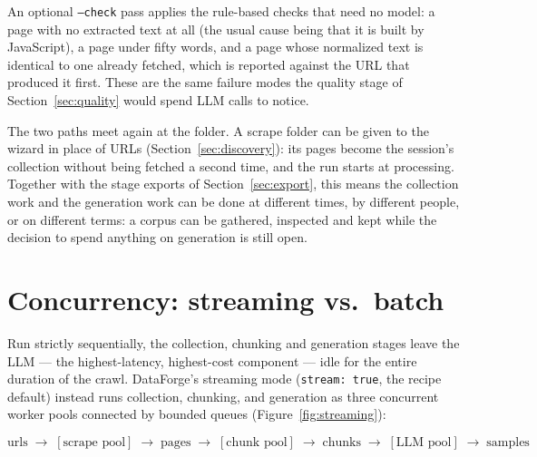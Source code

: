 \documentclass[11pt]{article}
\begin{document}
An optional \texttt{--check} pass applies the rule-based checks that need
no model: a page with no extracted text at all (the usual cause being
that it is built by JavaScript), a page under fifty words, and a page
whose normalized text is identical to one already fetched, which is
reported against the URL that produced it first. These are the same
failure modes the quality stage of Section~\ref{sec:quality} would spend
LLM calls to notice.

The two paths meet again at the folder. A scrape folder can be given to
the wizard in place of URLs (Section~\ref{sec:discovery}): its pages
become the session's collection without being fetched a second time, and
the run starts at processing. Together with the stage exports of
Section~\ref{sec:export}, this means the collection work and the
generation work can be done at different times, by different people, or
on different terms: a corpus can be gathered, inspected and kept while
the decision to spend anything on generation is still open.

\section{Concurrency: streaming vs.\ batch}
\label{sec:streaming}

Run strictly sequentially, the collection, chunking and generation stages
leave the LLM --- the highest-latency, highest-cost component --- idle
for the entire duration of the crawl. DataForge's streaming mode
(\texttt{stream: true}, the recipe default) instead runs collection,
chunking, and generation as three concurrent worker pools connected by
bounded queues (Figure~\ref{fig:streaming}):

\[
\text{urls} \;\longrightarrow\; [\text{scrape pool}] \;\longrightarrow\; \text{pages} \;\longrightarrow\; [\text{chunk pool}] \;\longrightarrow\; \text{chunks} \;\longrightarrow\; [\text{LLM pool}] \;\longrightarrow\; \text{samples}
\]
\end{document}
